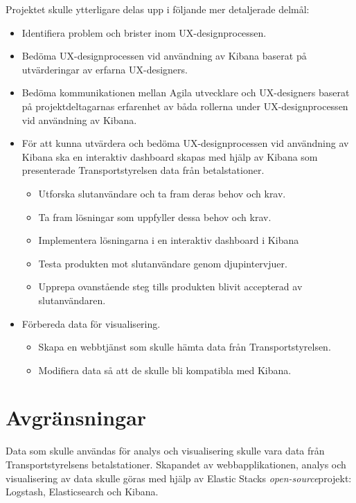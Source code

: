 \documentclass{kththesis}
\begin{document}
Projektet skulle ytterligare delas upp i följande mer detaljerade delmål:

\begin{itemize}

\item Identifiera problem och brister inom UX-designprocessen. 

\item Bedöma UX-designprocessen vid användning av Kibana baserat på utvärderingar av erfarna UX-designers. 

\item Bedöma kommunikationen mellan Agila utvecklare och UX-designers baserat på projektdeltagarnas erfarenhet av båda rollerna under UX-designprocessen vid användning av Kibana.

\item För att kunna utvärdera och bedöma UX-designprocessen vid användning av Kibana ska en interaktiv dashboard skapas med hjälp av Kibana som presenterade Transportstyrelsen data från betalstationer.

\begin{itemize}
\item Utforska slutanvändare och ta fram deras behov och krav.
\item Ta fram lösningar som uppfyller dessa behov och krav.
\item Implementera lösningarna i en interaktiv dashboard i Kibana 
\item Testa produkten mot slutanvändare genom djupintervjuer. 
\item Upprepa ovanstående steg tills produkten blivit accepterad av slutanvändaren.
\end{itemize}

\item Förbereda data för visualisering.
\begin{itemize}
\item Skapa en webbtjänst som skulle hämta data från Transportstyrelsen.
\item Modifiera data så att de skulle bli kompatibla med Kibana.
\end{itemize}

\end{itemize} 

\section{Avgränsningar}
Data som skulle användas för analys och visualisering skulle vara data från Transportstyrelsens betalstationer. Skapandet av webbapplikationen, analys och visualisering av data skulle göras med hjälp av Elastic Stacks \textit{open-source}projekt: Logstash, Elasticsearch och Kibana.  
\end{document}
